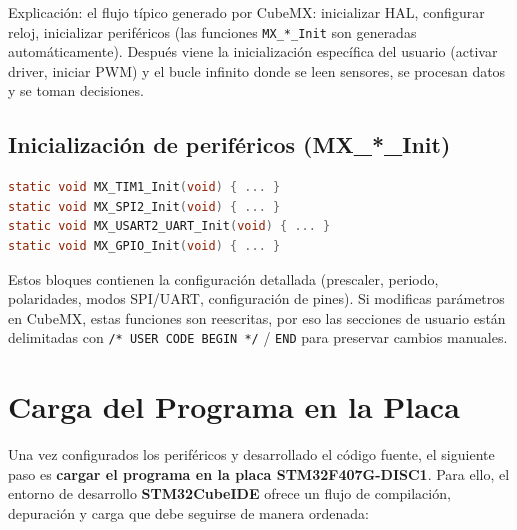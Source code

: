 \documentclass[a4paper,12pt]{article}
\begin{document}
Explicación: el flujo típico generado por CubeMX: inicializar HAL, configurar reloj, inicializar periféricos (las funciones \texttt{MX\_*\_Init} son generadas automáticamente). Después viene la inicialización específica del usuario (activar driver, iniciar PWM) y el bucle infinito donde se leen sensores, se procesan datos y se toman decisiones.

\subsection{Inicialización de periféricos (MX\_*\_Init)}
\begin{lstlisting}[language=C]
static void MX_TIM1_Init(void) { ... }
static void MX_SPI2_Init(void) { ... }
static void MX_USART2_UART_Init(void) { ... }
static void MX_GPIO_Init(void) { ... }
\end{lstlisting}

Estos bloques contienen la configuración detallada (prescaler, periodo, polaridades, modos SPI/UART, configuración de pines). Si modificas parámetros en CubeMX, estas funciones son reescritas, por eso las secciones de usuario están delimitadas con \texttt{/* USER CODE BEGIN */} / \texttt{END} para preservar cambios manuales.



\section{Carga del Programa en la Placa}

Una vez configurados los periféricos y desarrollado el código fuente, el siguiente paso es \textbf{cargar el programa en la placa STM32F407G-DISC1}. Para ello, el entorno de desarrollo \textbf{STM32CubeIDE} ofrece un flujo de compilación, depuración y carga que debe seguirse de manera ordenada:
\end{document}
